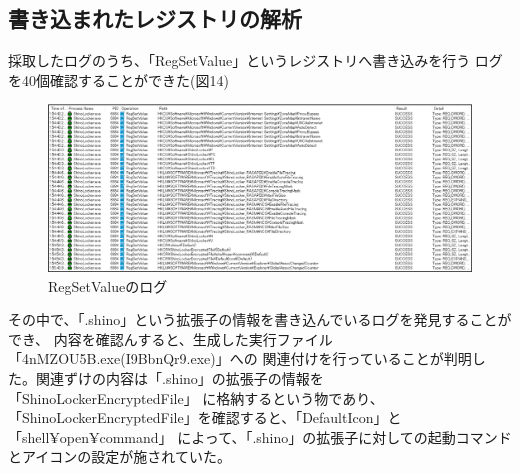 \documentclass[dvipdfmx,autodetect-engine]{jsarticle}
\begin{document}
\subsection{書き込まれたレジストリの解析}
採取したログのうち、「RegSetValue」というレジストリへ書き込みを行う
ログを40個確認することができた(図14)

\begin{figure}[H]
  \centering
  \includegraphics[scale=0.6]{pic14.png}
  \caption{RegSetValueのログ}
\end{figure}

その中で、「.shino」という拡張子の情報を書き込んでいるログを発見することができ、
内容を確認んすると、生成した実行ファイル「4nMZOU5B.exe(I9BbnQr9.exe)」への
関連付けを行っていることが判明した。関連ずけの内容は「.shino」の拡張子の情報を「ShinoLockerEncryptedFile」
に格納するという物であり、「ShinoLockerEncryptedFile」を確認すると、「DefaultIcon」と「shell¥open¥command」
によって、「.shino」の拡張子に対しての起動コマンドとアイコンの設定が施されていた。
\end{document}
